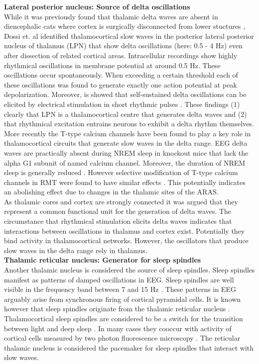 \textbf{Lateral posterior nucleus: Source of delta oscillations}\\
While it was previously found that thalamic delta waves are absent in diencephalic cats where cortex is surgically disconnected from lower stuctures \parencite{villablanca2004counterpointing}, Dossi et. al \parencite*{dossi1992electrophysiology} identified thalamocortical slow waves in the posterior lateral posterior nucleus of thalamus (LPN) that show delta oscillations (here: 0.5 - 4 Hz) even after dissection of related cortical areas. Intracellular recordings show highly rhythmical oscillations in membrane potential at around 0.5 Hz. These oscillations occur spontaneously. When exceeding a certain threshold each of these oscillations was found to generate exactly one action potential at peak depolarization. Moreover, is showed that self-sustained delta oscillations can be elicited by electrical stimulation in short rhythmic pulses \parencite{dossi1992electrophysiology}. These findings (1) clearly that LPN is a thalamocortical centre that generates delta waves and (2) that rhythmical excitation entrains neurons to exhibit a delta rhythm themselves.\\
More recently the T-type calcium channels have been found to play a key role in thalamocortical circuits that generate slow waves in the delta range. EEG delta waves are practically absent during NREM sleep in knockout mice that lack the alpha G1 subunit of named calcium channel. Moreover, the duration of NREM sleep is generally reduced \parencite{lee2004lack}. However selective modification of T-type calcium channels in RMT were found to have similar effects \parencite{brown2012control}. This potentially indicates an abolishing effect due to changes in the thalamic sites of the ARAS.\\
As thalamic cores and cortex are strongly connected it was argued that they represent a common functional unit for the generation of delta waves. The circumstance that rhythmical stimulation elicits delta waves indicates that interactions between oscillations in thalamus and cortex exist. Potentially they bind activity in thalamocortical networks. However, the oscillators that produce slow waves in the delta range rely in thalamus.\\

\textbf{Thalamic reticular nucleus: Generator for sleep spindles}\\
Another thalamic nucleus is considered the source of sleep spindles. Sleep spindles manifest as patterns of damped oscillations in EEG. Sleep spindles are well visible in the frequency band between 7 and 15 Hz \parencite{niethard2018cortical}. These patterns in EEG arguably arise from synchronous firing of cortical pyramidal cells. It is known however that sleep spindles originate from the thalamic reticular nucleus \parencite{luthi2014sleep}. Thalamocortical sleep spindles are considered to be a switch for the transition between light and deep sleep \parencite{montagna2005fatal}. In many cases they cooccur with activity of cortical cells measured by two photon fluorescence microscopy \parencite{niethard2018cortical}. The reticular thalamic nucleus is considered the pacemaker for sleep spindles that interact with slow waves.\\

